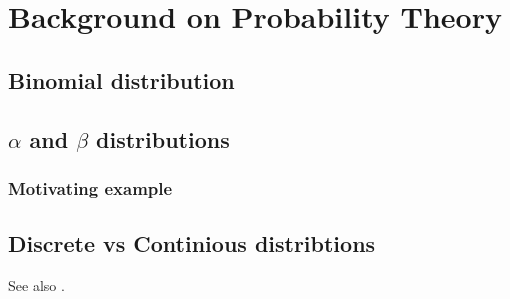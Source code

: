 \section{Background on Probability Theory}

\subsection{Binomial distribution}

\subsection{$\alpha$ and $\beta$ distributions}

\subsubsection{Motivating example}

\subsection{Discrete vs Continious distribtions}

See also \cite{Huff:1993:LS}.